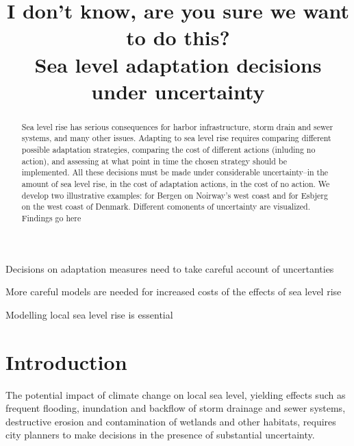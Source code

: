 \documentclass[draft,linenumbers]{agujournal}
\begin{document}
\title{I don't know, are you sure we want to do this?\\
Sea level adaptation decisions under uncertainty}




\begin{keypoints}
\item Decisions on adaptation measures need to take careful account of uncertanties
\item More careful models are needed for increased costs of the effects of sea level rise
\item Modelling local sea level rise is essential
\end{keypoints}


\begin{abstract}
Sea level rise has serious consequences for harbor infrastructure, storm drain and sewer systems, and many other issues. Adapting to sea level rise requires comparing different possible adaptation strategies, comparing the cost of different actions (inluding no action), and assessing at what point in time the chosen strategy should be implemented. All these decisions must be made under considerable uncertainty--in the amount of sea level rise, in the cost of adaptation actions, in the cost of no action. We develop two illustrative examples: for Bergen on Noirway's west coast and for Esbjerg on the west coast of Denmark. Different comonents of uncertainty are visualized. {\color{blue} Findings go here}
\end{abstract}




\section{Introduction}\label{sec:intro}
The potential impact of climate change on local sea level, yielding effects such as frequent flooding, inundation and backflow of storm drainage and sewer systems, destructive erosion and contamination of wetlands and other habitats, requires city planners to make decisions in the presence of substantial uncertainty.
\end{document}
